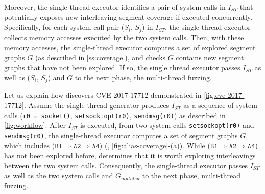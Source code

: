 Moreover, the single-thread executor identifies a pair of system calls
in $I_{ST}$ that potentially exposes new interleaving segment coverage
if executed concurrently.
%
Specifically, for each system call pair ($S_i$, $S_j$) in $I_{ST}$,
the single-thread executor collects memory accesses executed by the
two system calls. Then, with these memory accesses, the single-thread
executor computes a set of explored segment graphs $G$ (as described
in \autoref{ss:coverage}), and checks $G$ contains new segment graphs
that have not been explored.
%
If so, the single thread executor passes $I_{ST}$ as well as ($S_i$,
$S_j$) and $G$ to the next phase, the multi-thread fuzzing.


%
Let us explain how \sys discovers CVE-2017-17712 demonstrated in
\autoref{fig:cve-2017-17712}.
%
Assume the single-thread generator produces $I_{ST}$ as a sequence of
system calls (\texttt{r0 = socket()}, \texttt{setsocktopt(r0)},
\texttt{sendmsg(r0)}) as described in \autoref{fig:workflow}.
%
After $I_{ST}$ is executed, from two system calls
\texttt{setsockopt(r0)} and \texttt{sendmsg(r0)}, the single-thread
executor computes a set of segment graphs $G$, which includes
($\texttt{B1} \Rightarrow \texttt{A2} \Rightarrow \texttt{A4}$) (\ie,
\autoref{fig:alias-coverage}-(a)).
%
While ($\texttt{B1} \Rightarrow \texttt{A2} \Rightarrow \texttt{A4}$)
has not been explored before, \sys determines that it is worth
exploring interleavings between the two system calls.
%
Consequently, the single-thread executor passes $I_{ST}$ as well as
the two system calls and $G_{mutated}$ to the next phase, multi-thread
fuzzing.



%





